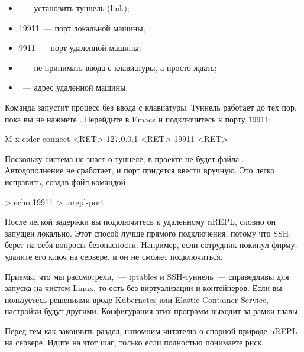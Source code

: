\begin{itemize}

\item
  ~--- установить туннель (link);

\item
  19911~--- порт локальной машины;

\item
  9911~--- порт удаленной машины;

\item
  ~--- не принимать ввода с клавиатуры, а просто ждать;

\item
  ~--- адрес удаленной машины.

\end{itemize}

Команда запустит процесс  без ввода с клавиатуры. Туннель работает до тех пор, пока вы не нажмете . Перейдите в Emacs и подключитесь к порту 19911:

\begin{english}
  \begin{clojure}
M-x cider-connect <RET> 127.0.0.1 <RET> 19911 <RET>
  \end{clojure}
\end{english}

Поскольку система не знает о туннеле, в проекте не будет файла . Автодополнение не сработает, и порт придется ввести вручную. Это легко исправить, создав файл командой

\begin{english}
  \begin{bash}
> echo 19911 > .nrepl-port
  \end{bash}
\end{english}

После легкой задержки вы подключитесь к удаленному nREPL, словно он запущен локально. Этот способ лучше прямого подключения, потому что SSH берет на себя вопросы безопасности. Например, если сотрудник покинул фирму, удалите его ключ на сервере, и он не сможет подключиться.

Приемы, что мы рассмотрели,~--- iptables и SSH-туннель~--- справедливы для запуска на чистом Linux, то есть без виртуализации и контейнеров. Если вы пользуетесь решениями вроде Kubernetes или Elastic Container Service, настройки будут другими. Конфигурация этих программ выходит за рамки главы.

Перед тем как закончить раздел, напомним читателю о спорной природе nREPL на сервере. Идите на этот шаг, только если полностью понимаете риск.


